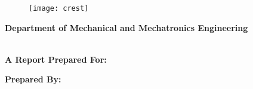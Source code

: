 \thispagestyle{empty}

\begin{center}
    \begin{figure}[H]
        \centering
        \texttt{[image: crest]}
    \end{figure}

    \textbf{Department of Mechanical and Mechatronics Engineering} \\ ~\\
\end{center}

\begin{center}
    \textbf{\LARGE \ReportTitle}
\end{center}

\begin{center}
    \textbf{A Report Prepared For:} \\
    \PreparedFor
\end{center}

\vspace*{\fill}

\begin{center}
    \textbf{Prepared By:} \\
    \Name \\
\end{center}

\newpage